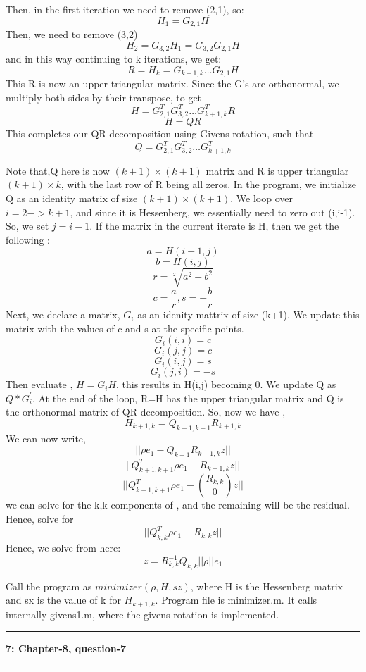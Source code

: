 \documentclass{article}
\newcommand\question[2]{\vspace{.25in}\hrule\textbf{#1: #2}\hrule\vspace{.10in}}
\begin{document}
   Then, in the first iteration we need to remove (2,1), so:
   \[H_1 = G_{2,1}H\]
   Then, we need to remove (3,2) 
   \[ H_2 = G_{3,2}H_1 = G_{3,2}G_{2,1}H\]
   and in this way continuing to k iterations, we get: 
   \[R = H_k = G_{k+1,k}\dots G_{2,1}H\]
   This R is now an upper triangular matrix. Since the G's are orthonormal, we multiply both sides by their transpose, to get 
   \[H = G_{2,1}^T G_{3,2}^T \dots G_{k+1,k}^T R\]
   \[H = QR\]
   This completes our QR decomposition using Givens rotation, such that 
   \[Q = G_{2,1}^T G_{3,2}^T \dots G_{k+1,k}^T\]

   Note that,Q here is now $(k+1)\times(k+1)$ matrix and R is upper triangular $(k+1)\times k$, with the last row of R being all zeros. \newline
   In the program, we initialize Q as an identity matrix of size $(k+1)\times(k+1)$. We loop over $i=2->k+1$, and since it is Hessenberg, we essentially need to zero out (i,i-1). So, we set $j=i-1$. If the matrix in the current iterate is H, then we get the following :
   \[ a = H(i-1,j)\]
   \[ b = H(i,j)\]
   \[ r = \sqrt[2]{a^2 + b^2}\]
   \[ c = \dfrac{a}{r}, s=-\dfrac{b}{r}\]
   Next, we declare a matrix, $G_{i}$ as an idenity mattrix of size (k+1). We update this matrix with the values of c and s at the specific points.
   \[ G_{i}(i,i) = c\]
   \[ G_{i}(j,j) = c\]
   \[ G_{i}(i,j) = s\]
   \[ G_{i}(j,i) = -s\]
   Then evaluate , $H = G_{i}H$, this results in H(i,j) becoming 0. We update Q as $Q*G_{i}^\prime$. At the end of the loop, R=H has the upper triangular matrix and Q is the orthonormal matrix of QR decomposition.\newline
   So, now we have ,
   \[H_{k+1,k} = Q_{k+1,k+1}R_{k+1,k}\]
   We can now write,
   \[||\rho e_1 - Q_{k+1}R_{k+1,k}z||\]
   \[||Q_{k+1,k+1}^T \rho e_1 - R_{k+1,k}z||\]
   \[||Q_{k+1,k+1}^T \rho e_1 - {{R_{k,k}}\choose{0}}z||\]
   we can solve for the k,k components of , and the remaining will be the residual. Hence, solve for 
   \[||Q_{k,k}^T \rho e_1 - R_{k,k}z||\]
   Hence, we solve from here:
   \[z = R_{k,k}^{-1} Q_{k,k}||\rho||e_1\]

   Call the program as $minimizer(\rho,H,sz) $, where H is the Hessenberg matrix and sx is the value of k for $H_{k+1,k}$. Program file is minimizer.m. It calls internally givens1.m, where the givens rotation is implemented. \newline


  \question{7}{Chapter-8, question-7}
\end{document}
